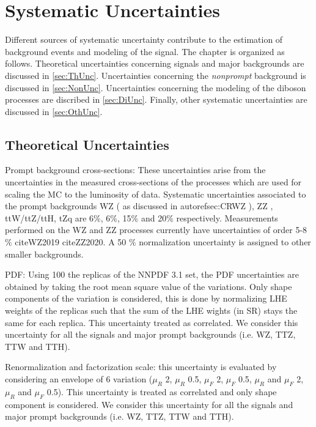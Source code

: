 \chapter{Systematic Uncertainties}
\label{chap:Systematics}

Different sources of systematic uncertainty contribute to the estimation of background events and modeling of the signal. The chapter is organized as follows. Theoretical uncertainties concerning signals and major backgrounds are discussed in \autoref{sec:ThUnc}. Uncertainties concerning the \emph{nonprompt} background is discussed in \autoref{sec:NonUnc}. Uncertainties concerning the modeling of the diboson processes are discribed in \autoref{sec:DiUnc}. Finally, other systematic uncertainties are discussed in \autoref{sec:OthUnc}.

\section{Theoretical Uncertainties}
\label{sec:ThUnc}

Prompt background cross-sections: These uncertainties arise from the uncertainties in the measured cross-sections of the processes which are used for scaling the MC to the luminosity of data. Systematic uncertainties associated to the prompt backgrounds WZ ( as discussed in autoref{sec:CRWZ} ), ZZ , ttW/ttZ/ttH, tZq are 6$\%$, 6$\%$, 15$\%$ and 20$\%$ respectively. Measurements performed on the WZ and ZZ processes currently have uncertainties of order 5-8$\%$ cite{WZ2019} cite{ZZ2020}. A 50 $\%$ normalization uncertainty is assigned to other smaller backgrounds.

PDF: Using 100 the replicas of the NNPDF 3.1 set, the PDF uncertainties are obtained by taking the root mean square value of the variations. Only shape components of the variation is considered, this is done by normalizing LHE weights of the replicas such that the sum of the LHE wights (in SR) stays the same for each replica. This uncertainty treated as correlated. We consider this uncertainty for all the signals and major prompt backgrounds (i.e. WZ, TTZ, TTW and TTH).

Renormalization and factorization scale: this uncertainty is evaluated by considering an envelope of 6 variation ($\mu_R$ 2, $\mu_R$ 0.5, $\mu_F$ 2, $\mu_F$ 0.5, $\mu_R$ and $\mu_F$ 2, $\mu_R$ and $\mu_F$ 0.5). This uncertainty is treated as correlated and only shape component is considered. We consider this uncertainty for all the signals and major prompt backgrounds (i.e. WZ, TTZ, TTW and TTH).

